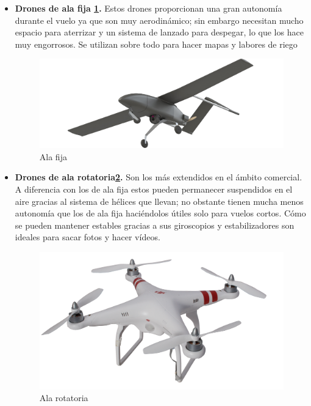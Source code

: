 \begin{itemize}
	\item \textbf{Drones de ala fija \ref{fig:Alafija}.} Estos drones proporcionan una gran autonomía durante el vuelo ya que son muy aerodinámico; sin embargo necesitan mucho espacio para aterrizar y un sistema de lanzado para despegar, lo que los hace muy engorrosos. Se utilizan sobre todo para hacer mapas y labores de riego
\begin{figure}[H]
	\center
	\includegraphics[scale=0.125]{imagenes/EstadodelArte/Alafija.png}
	\caption{Ala fija}
	\label{fig:Alafija}
\end{figure}
 
	\item \textbf{Drones de ala rotatoria\ref{fig:Alarotatoria}.} Son los más extendidos en el ámbito comercial. A diferencia con los de ala fija estos pueden permanecer suspendidos en el aire gracias al sistema de hélices que llevan; no obstante tienen mucha menos autonomía que los de ala fija haciéndolos útiles solo para vuelos cortos. Cómo se pueden mantener estables gracias a sus giroscopios y estabilizadores son ideales para sacar fotos y hacer vídeos.
\begin{figure}[H]
	\center
	\includegraphics[scale=0.1]{imagenes/EstadodelArte/Alarotatoria.png}
	\caption{Ala rotatoria}
	\label{fig:Alarotatoria}
\end{figure}
 
\end{itemize}

